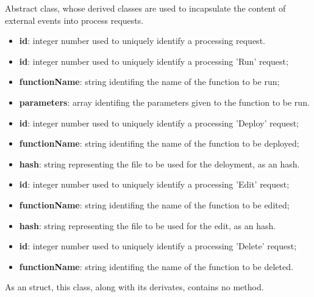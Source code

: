 	Abstract class, whose derived classes are used to incapsulate the content of external events into process requests.
	\begin{itemize}
		\item \textbf{id}: integer number used to uniquely identify a processing request.
	\end{itemize}
	\begin{itemize}
		\item \textbf{id}: integer number used to uniquely identify a processing 'Run' request;
		\item \textbf{functionName}: string identifing the name of the function to be run;
		\item \textbf{parameters}: array identifing the parameters given to the function to be run.
	\end{itemize}
	\begin{itemize}
		\item \textbf{id}: integer number used to uniquely identify a processing 'Deploy' request;
		\item \textbf{functionName}: string identifing the name of the function to be deployed;
		\item \textbf{hash}: string representing the file to be used for the deloyment, as an hash.
	\end{itemize}
	\begin{itemize}
		\item \textbf{id}: integer number used to uniquely identify a processing 'Edit' request;
		\item \textbf{functionName}: string identifing the name of the function to be edited;
		\item \textbf{hash}: string representing the file to be used for the edit, as an hash.
	\end{itemize}
	\begin{itemize}
		\item \textbf{id}: integer number used to uniquely identify a processing 'Delete' request;
		\item \textbf{functionName}: string identifing the name of the function to be deleted.
	\end{itemize}
	
	As an struct, this class, along with its derivates, contains no method.	
